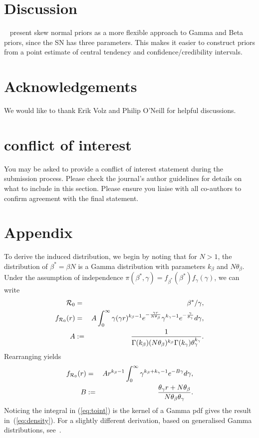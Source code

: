 \documentclass[alpha-refs]{wiley-article}
\newcommand{\rr}{ {\cal R}_0 }						%
\begin{document}
\section*{Discussion}

~\citep{Weidemann2014} present skew normal priors as a more flexible approach to Gamma and Beta priors, since the SN has three parameters.
This makes it easier to construct priors from a point estimate of central tendency and confidence/credibility intervals.

\section*{Acknowledgements}
We would like to thank Erik Volz and Philip O'Neill for helpful discussions.

\section*{conflict of interest}
You may be asked to provide a conflict of interest statement during the submission process. Please check the journal's author guidelines for details on what to include in this section. Please ensure you liaise with all co-authors to confirm agreement with the final statement.


\section{Appendix}

To derive the induced distribution, we begin by noting that for $N > 1$, the distribution of $\beta^{\ast} = \beta N$ is a Gamma distribution with parameters $k_{\beta}$ and $N\theta_{\beta}$.
Under the assumption of independence $\pi(\beta^{\ast}, \gamma) = f_{\beta^\ast}(\beta^{\ast})f_{\gamma}(\gamma)$, we can write
\begin{eqnarray}
\rr &=& \beta^{\ast}/\gamma,\\
f_{\rr}(r) &=& A \int_{0}^{\infty} \gamma(\gamma r)^{k_{\beta} -1} e^{-\frac{\gamma r}{N\theta_{\beta}}} \gamma^{k_{\gamma} -1} e^{-\frac{\gamma}{\theta_{\gamma}}} d\gamma, \\
\nonumber
A &:=& \frac{1}{\Gamma(k_{\beta})(N\theta_{\beta})^{k_{\beta}}\Gamma(k_{\gamma})\theta_{\gamma}^{k_{\gamma}}}.
\end{eqnarray}
Rearranging yields
\begin{eqnarray}
\label{eq:toint}
f_{\rr}(r) &=& A  r^{k_{\beta} -1} \int_{0}^{\infty} \gamma^{k_{\beta} + k_{\gamma} -1} e^{-B\gamma} d\gamma, \\
\nonumber
        B  &:=& \frac{\theta_{\gamma} r + N\theta_{\beta}}{N\theta_{\beta}\theta_{\gamma}}.
\end{eqnarray}
Noticing the integral in (\ref{eq:toint}) is the kernel of a Gamma pdf gives the result in~(\ref{eq:density}).
For a slightly different derivation, based on generalised Gamma distributions, see~\cite{Coelho2007}.
\end{document}
